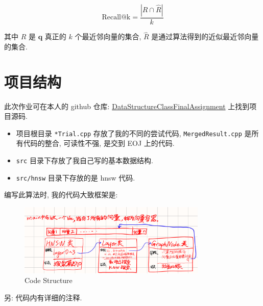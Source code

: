\documentclass[11pt, UTF8]{article}
\begin{document}
    \[
        \text{Recall@k} = \frac{|R \cap \hat{R}|}{k}
    \]

    其中 \(R\) 是 \(\mathbf{q}\) 真正的 \(k\) 个最近邻向量的集合, \(\hat{R}\) 是通过算法得到的近似最近邻向量的集合.


    


    \section{项目结构}
    此次作业可在本人的 github 仓库: \href{https://github.com/azazo1/DataStructureClassFinalAssignment}{DataStructureClassFinalAssignment}
    上找到项目源码.

    \begin{itemize}
        \item 项目根目录 \texttt{*Trial.cpp} 存放了我的不同的尝试代码, \texttt{MergedResult.cpp} 是所有代码的整合,
        可读性不强, 是交到 EOJ 上的代码.
        \item \texttt{src} 目录下存放了我自己写的基本数据结构.
        \item \texttt{src/hnsw} 目录下存放的是 hnsw 代码.
    \end{itemize}

    编写此算法时, 我的代码大致框架是:

    \begin{figure}[H]
        \centering
        \includegraphics[width=0.8\textwidth]{img/code-structure}
        \caption{Code Structure}
        \label{fig:code-structure}
    \end{figure}

    另: 代码内有详细的注释.
\end{document}
